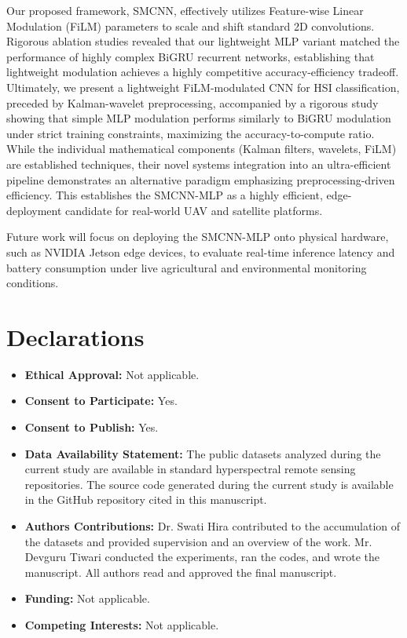\documentclass[pdflatex,sn-mathphys-num,iicol]{sn-jnl}
\begin{document}
Our proposed framework, SMCNN, effectively utilizes Feature-wise Linear Modulation (FiLM) parameters to scale and shift standard 2D convolutions. Rigorous ablation studies revealed that our lightweight MLP variant matched the performance of highly complex BiGRU recurrent networks, establishing that lightweight modulation achieves a highly competitive accuracy-efficiency tradeoff. Ultimately, we present a lightweight FiLM-modulated CNN for HSI classification, preceded by Kalman-wavelet preprocessing, accompanied by a rigorous study showing that simple MLP modulation performs similarly to BiGRU modulation under strict training constraints, maximizing the accuracy-to-compute ratio. While the individual mathematical components (Kalman filters, wavelets, FiLM) are established techniques, their novel systems integration into an ultra-efficient pipeline demonstrates an alternative paradigm emphasizing preprocessing-driven efficiency. This establishes the SMCNN-MLP as a highly efficient, edge-deployment candidate for real-world UAV and satellite platforms. 

Future work will focus on deploying the SMCNN-MLP onto physical hardware, such as NVIDIA Jetson edge devices, to evaluate real-time inference latency and battery consumption under live agricultural and environmental monitoring conditions.

\section*{Declarations}

\begin{itemize}
\item \textbf{Ethical Approval:} Not applicable.
\item \textbf{Consent to Participate:} Yes.
\item \textbf{Consent to Publish:} Yes.
\item \textbf{Data Availability Statement:} The public datasets analyzed during the current study are available in standard hyperspectral remote sensing repositories. The source code generated during the current study is available in the GitHub repository cited in this manuscript.
\item \textbf{Authors Contributions:} Dr. Swati Hira contributed to the accumulation of the datasets and provided supervision and an overview of the work. Mr. Devguru Tiwari conducted the experiments, ran the codes, and wrote the manuscript. All authors read and approved the final manuscript.
\item \textbf{Funding:} Not applicable.
\item \textbf{Competing Interests:} Not applicable.
\end{itemize}
\end{document}
